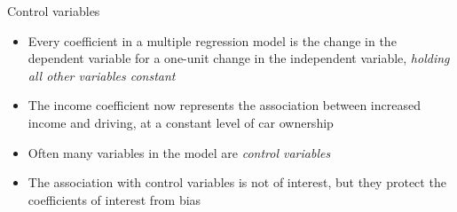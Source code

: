 \begin{frame}{Control variables}
  \begin{itemize}
    \item Every coefficient in a multiple regression model is the change in the dependent variable for a one-unit change in the independent variable, \emph{holding all other variables constant}
    \item The income coefficient now represents the association between increased income and driving, at a constant level of car ownership
    \item Often many variables in the model are \emph{control variables}
    \item The association with control variables is not of interest, but they protect the coefficients of interest from bias
  \end{itemize}
\end{frame}

